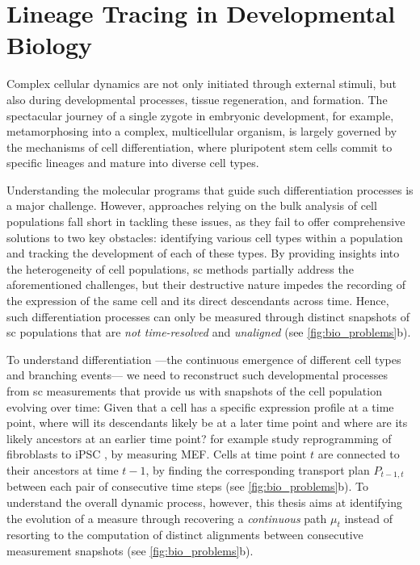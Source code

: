 \section{Lineage Tracing in Developmental Biology}
\label{sec:cell_differentiation}

Complex cellular dynamics are not only initiated through external stimuli, but also during developmental processes, tissue regeneration, and formation.
The spectacular journey of a single zygote in embryonic development, for example, metamorphosing into a complex, multicellular organism, is largely governed by the mechanisms of cell differentiation, where pluripotent stem cells commit to specific lineages and mature into diverse cell types.

Understanding the molecular programs that guide such differentiation processes is a major challenge.
However, approaches relying on the bulk analysis of cell populations fall short in tackling these issues, as they fail to offer comprehensive solutions to two key obstacles: identifying various cell types within a population and tracking the development of each of these types.
By providing insights into the heterogeneity of cell populations, \acrlong{sc} methods partially address the aforementioned challenges, but their destructive nature impedes the recording of the expression of the same cell and its direct descendants across time.
Hence, such differentiation processes can only be measured through distinct snapshots of \acrlong{sc} populations that are \textit{not time-resolved} and \textit{unaligned} (see \cref{fig:bio_problems}b).

To understand differentiation ---the continuous emergence of different cell types and branching events--- we need to reconstruct such developmental processes from \acrlong{sc} measurements that provide us with snapshots of the cell population evolving over time:
Given that a cell has a specific expression profile at a time point, where will its descendants likely be at a later time point and where are its likely ancestors at an earlier time point? 
\citet{schiebinger2019optimal} for example study reprogramming of fibroblasts to \acrfull{iPSC} \citep{takahashi2006induction}, by measuring \acrfull{MEF}. Cells at time point $t$ are connected to their ancestors at time $t-1$, by finding the corresponding transport plan $P_{t-1,t}$ between each pair of consecutive time steps (see \cref{fig:bio_problems}b).
To understand the overall dynamic process, however, this thesis aims at identifying the evolution of a measure through recovering a \emph{continuous} path $\mu_t$ instead of resorting to the computation of distinct alignments between consecutive measurement snapshots \citep{lavenant2021towards} (see \cref{fig:bio_problems}b).

